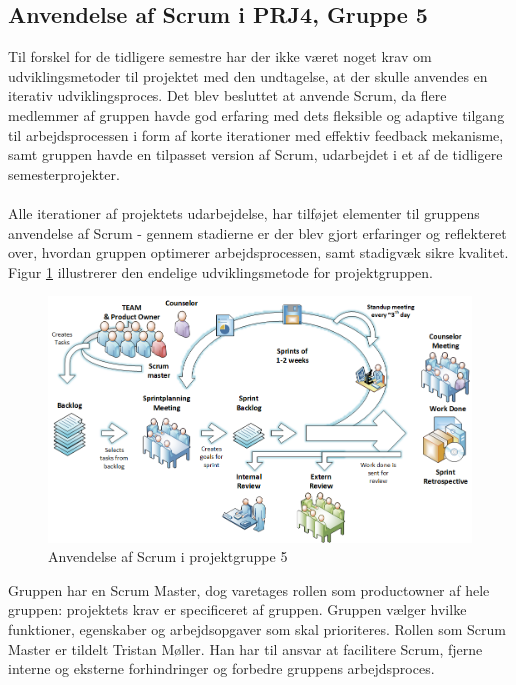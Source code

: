 \documentclass[Rapport/Rapport_main.tex]{subfiles}
\begin{document}
\subsection{Anvendelse af Scrum i PRJ4, Gruppe 5}
Til forskel for de tidligere semestre har der ikke været noget krav om udviklingsmetoder til projektet med den undtagelse, at der skulle anvendes en iterativ udviklingsproces. Det blev besluttet at anvende Scrum, da flere medlemmer af gruppen havde god erfaring med dets fleksible og adaptive tilgang til arbejdsprocessen i form af korte iterationer med effektiv feedback mekanisme, samt gruppen havde en tilpasset version af Scrum, udarbejdet i et af de tidligere semesterprojekter. \\\\
Alle iterationer af projektets udarbejdelse, har tilføjet elementer til gruppens anvendelse af Scrum - gennem stadierne er der blev gjort erfaringer og reflekteret over, hvordan gruppen optimerer arbejdsprocessen, samt stadigvæk sikre kvalitet. Figur \ref{fig:scrum_usage} illustrerer den endelige udviklingsmetode for projektgruppen. 
\begin{figure}[H]
    \centering
    \includegraphics[width=\textwidth]{ProcesDokument/graphics/Scrum_usage.png}
    \caption{Anvendelse af Scrum i projektgruppe 5}
    \label{fig:scrum_usage}
\end{figure}
Gruppen har en Scrum Master, dog varetages rollen som productowner af hele gruppen: projektets krav er specificeret af gruppen. Gruppen vælger hvilke funktioner, egenskaber og arbejdsopgaver som skal prioriteres. Rollen som Scrum Master er tildelt Tristan Møller. Han har til ansvar at facilitere Scrum, fjerne interne og eksterne forhindringer og forbedre gruppens arbejdsproces. \\\\
\end{document}

